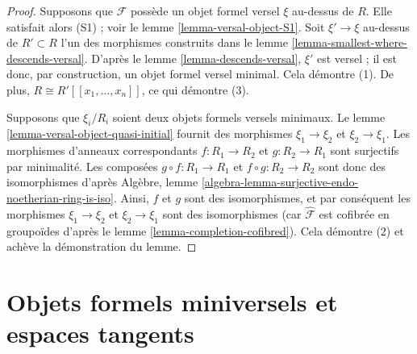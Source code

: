 \begin{proof}
Supposons que $\mathcal{F}$ possède un objet formel versel $\xi$ au-dessus de
$R$. Elle satisfait alors (S1) ; voir le lemme
\ref{lemma-versal-object-S1}. Soit $\xi' \to \xi$ au-dessus de
$R' \subset R$ l'un des morphismes construits dans le lemme
\ref{lemma-smallest-where-descends-versal}. D'après le lemme
\ref{lemma-descends-versal}, $\xi'$ est versel ; il est donc, par
construction, un objet formel versel minimal. Cela démontre (1). De plus,
$R \cong R'[[x_1, \ldots, x_n]]$, ce qui démontre (3).

\medskip\noindent
Supposons que $\xi_i/R_i$ soient deux objets formels versels minimaux. Le
lemme \ref{lemma-versal-object-quasi-initial} fournit des morphismes
$\xi_1 \to \xi_2$ et $\xi_2 \to \xi_1$. Les morphismes d'anneaux
correspondants $f : R_1 \to R_2$ et $g : R_2 \to R_1$ sont surjectifs par
minimalité. Les composées $g \circ f : R_1 \to R_1$ et
$f \circ g : R_2 \to R_2$ sont donc des isomorphismes d'après Algèbre, lemme
\ref{algebra-lemma-surjective-endo-noetherian-ring-is-iso}. Ainsi, $f$ et $g$
sont des isomorphismes, et par conséquent les morphismes
$\xi_1 \to \xi_2$ et $\xi_2 \to \xi_1$ sont des isomorphismes (car
$\widehat{\mathcal{F}}$ est cofibrée en groupoïdes d'après le lemme
\ref{lemma-completion-cofibred}). Cela démontre (2) et achève la démonstration
du lemme.
\end{proof}








\section{Objets formels miniversels et espaces tangents}
\label{section-miniversal-objects-existence}

